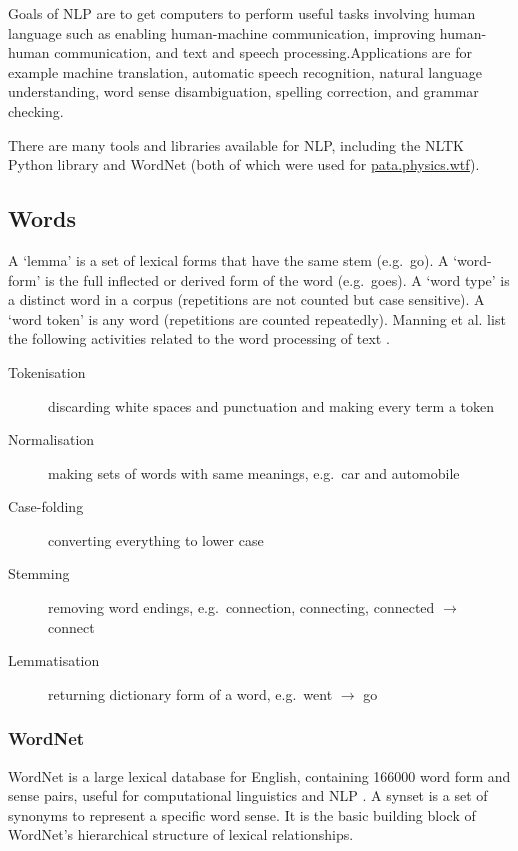 Goals of \ac{NLP} are to get computers to perform useful tasks involving human language such as enabling human-machine communication, improving human-human communication, and text and speech processing.Applications are for example machine translation, automatic speech recognition, natural language understanding, word sense disambiguation, spelling correction, and grammar checking.

There are many tools and libraries available for \ac{NLP}, including the \ac{NLTK} Python library \autocite{Bird2009, NLTK2016} and WordNet \autocite{Princeton2010} (both of which were used for \url{pata.physics.wtf}).


\subsection{Words}

A `lemma' is a set of lexical forms that have the same stem (e.g.\ go). A `word-form' is the full inflected or derived form of the word (e.g.\ goes). A `word type' is a distinct word in a corpus (repetitions are not counted but case sensitive). A `word token' is any word (repetitions are counted repeatedly). Manning et al. list the following activities related to the word processing of text \autocite*{Manning2009}.

\begin{description}
  \item [Tokenisation] discarding white spaces and punctuation and making every term a token
  \item [Normalisation] making sets of words with same meanings, e.g.\ car and automobile
  \item [Case-folding] converting everything to lower case
  \item [Stemming] removing word endings, e.g.\ connection, connecting, connected $\to$ connect
  \item [Lemmatisation] returning dictionary form of a word, e.g.\ went $\to$ go
\end{description}


\subsubsection{WordNet}
\label{s:wordnet}

WordNet is a large lexical database for English, containing \num{166000} word form and sense pairs, useful for computational linguistics and \ac{NLP} \autocite{Miller1995}. A synset is a set of synonyms to represent a specific word sense. It is the basic building block of WordNet's hierarchical structure of lexical relationships.

